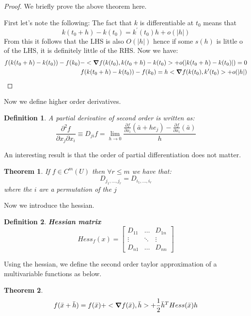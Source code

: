 \documentclass[titlepage]{article}
\newtheorem{theorem}{Theorem}[section]
\newtheorem{definition}{Definition}
\begin{document}
\begin{proof}
We briefly prove the above theorem here.

First let's note the following:
The fact that $k$ is differentiable at $t_{0}$ means that 
$$k(t_{0}+h) - k(t_{0}) = k^{\prime}(t_{0})h + o(|h|) $$ From this it follows that the LHS is also $O(|h|)$ hence if some $s(h)$ is little o of the LHS, it is definitely little of the RHS. Now we have:
\begin{align*}
    f(k(t_{0}+h) - k(t_{0})) - f(k_{0}) - <\grad f(k(t_{0}),k(t_{0}+h) - k(t_{0})> + o(|k(t_{0}+h) - k(t_{0})|) = 0\\
     f(k(t_{0}+h) - k(t_{0})) - f(k_{0}) = h<\grad f(k(t_{0}),k^{\prime}(t_{0})> + o(|h|)
\end{align*}
\end{proof}

Now we define higher order derivatives. 
\begin{definition}
A partial derivative of second order is written as:
$$\frac{\partial^{2}f}{\partial x_{j} \partial x_{i}} \equiv D_{ji}f = \lim_{h\to 0}\frac{\frac{\partial f}{\partial x_{i}}(\bar{a} + he_{j}) - \frac{\partial f}{\partial x_{i}}(\bar{a})}{h} $$
\end{definition}

An interesting result is that the order of partial differentiation does not matter.
\begin{theorem}
If $f \in C^{m}(U)$ then $\forall r \leq m$ we have that:
$$D_{j_{1},\ldots, j_{r}} = D_{i_{1},\ldots, i_{r}} $$ where the $i$ are a permutation of the $j$
\end{theorem}

Now we introduce the hessian. 

\begin{definition}\textbf{Hessian matrix}
$$ Hess_{f}(x) = 
\begin{bmatrix}
 D_{11} & \ldots & D_{1n}\\
 \vdots & \ddots & \vdots\\
 D_{n1} & \ldots & D_{nn}
\end{bmatrix}
$$
\end{definition}

Using the hessian, we define the second order taylor approximation of a multivariable functions as below.

\begin{theorem}
$$f(\bar{x}+\bar{h}) = f(\bar{x}) + <\grad f(\bar{x}),\bar{h}> + \frac{1}{2} \bar{h}^{T} Hess(\bar{x})h$$
\end{theorem}
\end{document}
